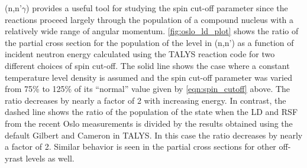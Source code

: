\documentclass[letterpaper]{ar-1col}
\begin{document}
(n,n'$\gamma$) provides a useful tool for studying the spin cut-off parameter since the reactions proceed largely through the population of a compound nucleus with a relatively wide range of angular momentum.
\autoref{fig:oslo_ld_plot} shows the ratio of the partial cross section for the population of the  level in (n,n') as a function of incident neutron energy calculated using the TALYS reaction code for two different choices of spin cut-off.
 The solid line shows the case where a constant temperature level density is assumed and the spin cut-off parameter was varied from 75\% to 125\% of its \enquote{normal} value given by \autoref{eqn:spin_cutoff} above.
 The ratio decreases by nearly a factor of 2 with increasing energy.
 In contrast, the dashed line shows the ratio of the  population of the  state when the LD and RSF from the recent Oslo measurements \cite{Gut13a} is divided by the results obtained using the default Gilbert and Cameron in TALYS.
 In this case the ratio decreases by nearly a factor of 2.
 Similar behavior is seen in the partial cross sections for other off-yrast levels as well.
\end{document}
